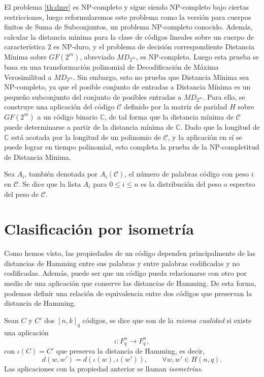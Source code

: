 El problema \ref{th:dmv} es NP-completo y sigue siendo NP-completo bajo ciertas restricciones, luego reformularemos este problema como la versión para cuerpos finitos de Suma de Subconjuntos, un problema NP-completo conocido. Además, calcular la distancia mínima para la clase de códigos lineales sobre un cuerpo de característica 2 es NP-duro, y el problema de decisión correspondiente Distancia Mínima sobre $GF(2^m)$, abreviado $MD_{2^m}$, es NP-completo. Luego esta prueba se basa en una transformación polinomial de Decodificación de Máxima Verosimilitud a $MD_{2^m}$. Sin embargo, esto no prueba que Distancia Mínima sea NP-completo, ya que el posible conjunto de entradas a Distancia Mínima es un pequeño subconjunto del conjunto de posibles entradas a $MD_{2^m}$. Para ello, se construye una aplicación del código $\mathcal{C}$ definido por la matriz de paridad $H$ sobre $GF(2^m)$ a un código binario $\mathbb{C}$, de tal forma que la distancia mínima de $\mathcal{C}$ puede determinarse a partir de la distancia mínima de $\mathbb{C}$. Dado que la longitud de $\mathbb{C}$ está acotada por la longitud de un polinomio de $\mathcal{C}$, y la aplicación en sí se puede lograr en tiempo polinomial, esto completa la prueba de la NP-completitud de Distancia Mínima.

\begin{definition}
    Sea $A_i$, también denotada por $A_i(\mathcal{C})$, el número de palabras código con peso $i$ en $\mathcal{C}$. Se dice que la lista $A_i$ para $0 \leq i \leq n$ es la distribución del peso o espectro del peso de $\mathcal{C}$.
\end{definition}

\section{Clasificación por isometría}

Como hemos visto, las propiedades de un código dependen principalmente de las distancias de Hamming entre sus palabras y entre palabras codificadas y no codificadas. Además, puede ser que un código pueda relacionarse con otro por medio de una aplicación que conserve las distancias de Hamming. De esta forma, podemos definir una relación de equivalencia entre dos códigos que preservan la distancia de Hamming.

Sean $C$ y $C'$ dos $[n,k]_q$ códigos, se dice que son de la \emph{misma cualidad} si existe una aplicación
\[
    \iota : F^n_q \rightarrow F^n_q,
\]
con $\iota(C) = C'$ que preserva la distancia de Hamming, es decir, 
\[
    d(w,w') = d(\iota (w), \iota(w')), \qquad \forall w,w' \in H(n,q).
\]
Las aplicaciones con la propiedad anterior se llaman \emph{isometrías}.


